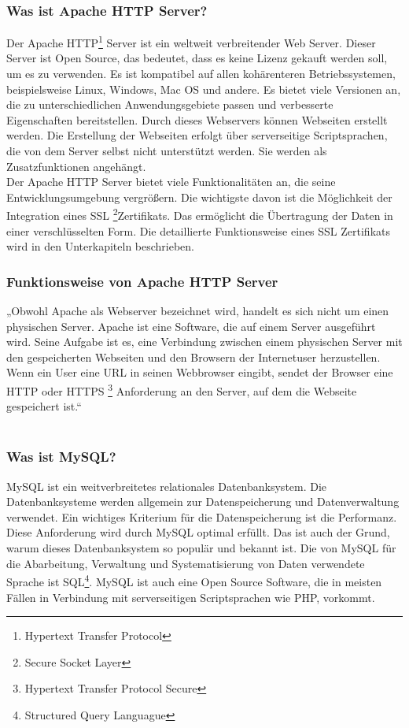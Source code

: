 \subsubsection{Was ist Apache HTTP Server?} 
Der Apache HTTP\footnote{Hypertext Transfer Protocol} Server ist ein weltweit verbreitender Web Server. Dieser Server ist Open Source, das bedeutet, dass es keine Lizenz gekauft werden soll, um es zu verwenden. Es ist kompatibel auf allen kohärenteren Betriebssystemen, beispielsweise Linux, Windows, Mac OS und andere. Es bietet viele Versionen an, die zu unterschiedlichen Anwendungsgebiete passen und verbesserte Eigenschaften bereitstellen. Durch dieses Webservers können Webseiten erstellt werden. Die Erstellung der Webseiten erfolgt über serverseitige Scriptsprachen, die von dem Server selbst nicht unterstützt werden. Sie werden als Zusatzfunktionen angehängt. \\
Der Apache HTTP Server bietet viele Funktionalitäten an, die seine Entwicklungsumgebung vergrößern. Die wichtigste davon ist die Möglichkeit der Integration eines SSL \footnote{Secure Socket Layer}Zertifikats. Das ermöglicht die Übertragung der Daten in einer verschlüsselten Form. Die detaillierte Funktionsweise eines SSL Zertifikats wird in den Unterkapiteln beschrieben.  \cite{50_apache}
\subsubsection{Funktionsweise von Apache HTTP Server} 
„Obwohl Apache als Webserver bezeichnet wird, handelt es sich nicht um einen physischen Server. Apache ist eine Software, die auf einem Server ausgeführt wird. Seine Aufgabe ist es, eine Verbindung zwischen einem physischen Server mit den gespeicherten Webseiten und den Browsern der Internetuser herzustellen. \\
Wenn ein User eine URL in seinen Webbrowser eingibt, sendet der Browser eine HTTP oder HTTPS \footnote{Hypertext Transfer Protocol Secure} Anforderung an den Server, auf dem die Webseite gespeichert ist.“ \cite{50_apache} \\
\\

\subsubsection{Was ist MySQL?} 
MySQL ist ein weitverbreitetes relationales Datenbanksystem. Die Datenbanksysteme werden allgemein zur Datenspeicherung und Datenverwaltung verwendet. Ein wichtiges Kriterium für die Datenspeicherung ist die Performanz. Diese Anforderung wird durch MySQL optimal erfüllt. Das ist auch der Grund, warum dieses Datenbanksystem so populär und bekannt ist. Die von MySQL für die Abarbeitung, Verwaltung und Systematisierung von Daten verwendete Sprache ist SQL\footnote{Structured Query Languague}. MySQL ist auch eine Open Source Software,
die in meisten Fällen in Verbindung mit serverseitigen Scriptsprachen wie PHP, vorkommt. \cite{50_mysql}
